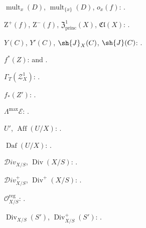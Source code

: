 $\operatorname{mult}_x(D)$, $\operatorname{mult}_{\{x\}}(D)$,
$o_x(f)$: .

$\mathrm Z^+(f)$, $\mathrm Z^-(f)$, $\mathfrak Z^1_{\mathrm{princ}}(X)$,
$\mathfrak{Cl}(X)$: .

$Y(C)$, $Y'(C)$, $\sh{J}_X(C)$, $\sh{J}(C)$:
.

$f^*(Z)$:  and .

$\Gamma_T(\mathscr Z_X^1)$: .

$f_*(Z')$: .

$\Lambda^{\max}\mathcal E$: .

$U'$, $\operatorname{Aff}(U/X)$: .

$\operatorname{Daf}(U/X)$: .

$\mathcal{D}iv_{X/S}$, $\operatorname{Div}(X/S)$:
.

$\mathcal{D}iv_{X/S}^+$, $\operatorname{Div}^+(X/S)$:
.

$\mathcal O_{X/S}^{\mathrm{reg}}$: .

$\operatorname{Div}_{X/S}(S')$, $\operatorname{Div}_{X/S}^+(S')$:
.

\endgroup
